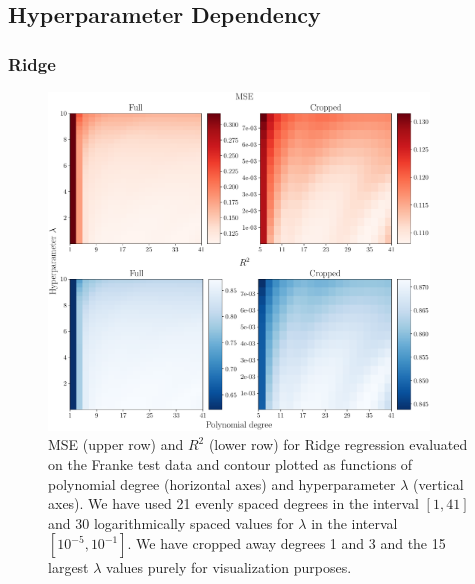 \documentclass[aps,pra,english,notitlepage,reprint,nofootinbib]{revtex4-1}  %
\begin{document}
\subsection{Hyperparameter Dependency}
\subsubsection{Ridge}
\begin{figure}
  \vspace*{-5pt}
  \centering %
  \includegraphics[width=0.9\textwidth]{../figs/b_MSE_R2.pdf}
  \caption{MSE (upper row) and $R^2$ (lower row) for Ridge regression evaluated on the Franke test data and contour plotted as functions of polynomial degree (horizontal axes) and hyperparameter $\lambda$ (vertical axes). We have used 21 evenly spaced degrees in the interval $[1, 41]$ and 30 logarithmically spaced values for $\lambda$ in the interval $[10^{-5},10^{-1}]$. We have cropped away degrees 1 and 3 and the 15 largest $\lambda$ values purely for visualization purposes.}\label{fig:b MSE R2}
  \vspace*{-5pt}
\end{figure}
\end{document}
